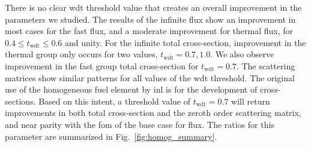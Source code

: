 There is no clear \gls{wdt} threshold value that creates an overall
improvement in the parameters we studied. The results of the infinite
flux show an improvement in most cases for the fast flux, and a
moderate improvement for thermal flux, for $0.4 \leq t_{\mathrm{wdt}} \leq
0.6$ and unity. For the infinite total cross-section, improvement in
the thermal group only occurs for two values, $t_{\mathrm{wdt}} = 0.7,
1.0$. We also observe improvement in the fast group total
cross-section for $t_{\mathrm{wdt}} = 0.7$. The scattering matrices
show similar patterns for all values of the \gls{wdt} threshold. The
original use of the homogeneous fuel element by \gls{inl} is for the
development of cross-sections. Based on this intent, a threshold value
of $t_{\mathrm{wdt}} = 0.7$ will return improvements in both total
cross-section and the zeroth order scattering matrix, and near parity
with the \gls{fom} of the base case for flux. The ratios for this
parameter are summarized in Fig.~\ref{fig:homog_summary}.

